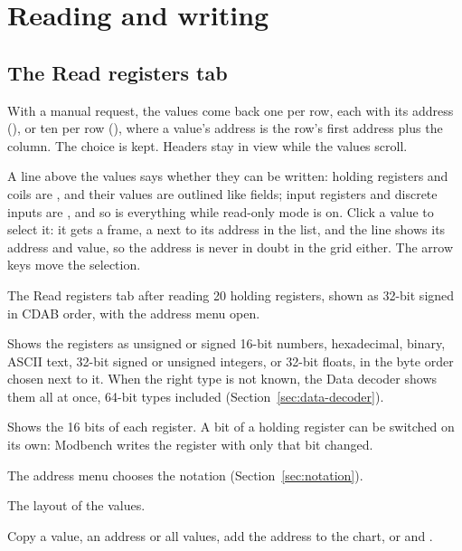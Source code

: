 \chapter{Reading and writing}
\label{ch:read-write}

\section{The Read registers tab}

With a manual request, the values come back one per row, each with its address
(), or ten per row (), where a value's address is the row's
first address plus the column. The choice is kept. Headers stay in view while
the values scroll.

A line above the values says whether they can be written: holding registers
and coils are , and their values are outlined like fields; input
registers and discrete inputs are , and so is everything while
read-only mode is on. Click a value to select it: it gets a frame, a 
next to its address in the list, and the line shows its address and value, so
the address is never in doubt in the grid either. The arrow keys move the
selection.

  {The Read registers tab after reading 20 holding registers, shown as 32-bit
   signed in CDAB order, with the address menu open.}

\begin{description}[style=nextline, leftmargin=0pt, font=\intermedium]
  \item[Show as] Shows the registers as unsigned or signed 16-bit numbers,
    hexadecimal, binary, ASCII text, 32-bit signed or unsigned integers, or
    32-bit floats, in the byte order chosen next to it. When the right type is
    not known, the Data decoder shows them all at once, 64-bit types included
    (Section~\ref{sec:data-decoder}).
  \item[Bits] Shows the 16 bits of each register. A bit of a holding register
    can be switched on its own: Modbench writes the register with only that
    bit changed.
  \item[Addresses] The address menu chooses the notation
    (Section~\ref{sec:notation}).
  \item[List, Grid] The layout of the values.
  \item[Right-click] Copy a value, an address or all values, add the address
    to the chart, or  and .
\end{description}

